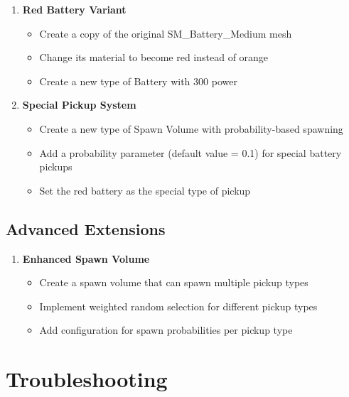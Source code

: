 \documentclass[
  letterpaper,
  DIV=11,
  numbers=noendperiod]{scrartcl}
\providecommand{\tightlist}{%
  \setlength{\itemsep}{0pt}\setlength{\parskip}{0pt}}
\begin{document}
\begin{enumerate}
\def\labelenumi{\arabic{enumi}.}
\setcounter{enumi}{3}
\tightlist
\item
  \textbf{Red Battery Variant}

  \begin{itemize}
  \tightlist
  \item
    Create a copy of the original SM\_Battery\_Medium mesh
  \item
    Change its material to become red instead of orange
  \item
    Create a new type of Battery with 300 power
  \end{itemize}
\item
  \textbf{Special Pickup System}

  \begin{itemize}
  \tightlist
  \item
    Create a new type of Spawn Volume with probability-based spawning
  \item
    Add a probability parameter (default value = 0.1) for special
    battery pickups
  \item
    Set the red battery as the special type of pickup
  \end{itemize}
\end{enumerate}

\subsection{Advanced Extensions}\label{advanced-extensions}

\begin{enumerate}
\def\labelenumi{\arabic{enumi}.}
\setcounter{enumi}{5}
\tightlist
\item
  \textbf{Enhanced Spawn Volume}

  \begin{itemize}
  \tightlist
  \item
    Create a spawn volume that can spawn multiple pickup types
  \item
    Implement weighted random selection for different pickup types
  \item
    Add configuration for spawn probabilities per pickup type
  \end{itemize}
\end{enumerate}

\section{Troubleshooting}\label{troubleshooting}
\end{document}
